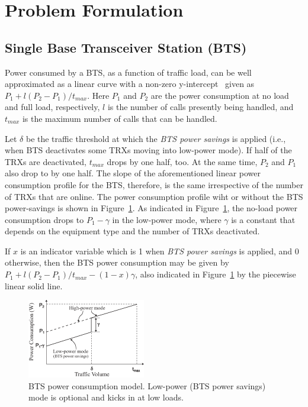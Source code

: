 \section{Problem Formulation}
\label{sec:formulation}
\subsection{Single Base Transceiver Station (BTS)}
Power consumed by a BTS, as a function of traffic load, can be
well approximated as a linear curve with a non-zero
y-intercept~\cite{Peng:2011:BTSSaving:Mobicom} given as
$P_1+l(P_2-P_1)/t_{max}$. Here $P_1$ and $P_2$ are the power
consumption at no load and full load, respectively, $l$ is the
number of calls presently being handled, and $t_{max}$ is the
maximum number of calls that can be handled.

Let $\delta$ be the traffic threshold at which the \textit{BTS
power savings} is applied (i.e., when BTS deactivates some TRXs
moving into low-power mode). If half of the TRXs are deactivated, $t_{max}$ drops by one half, too. At the same time, $P_2$ and $P_1$ also drop to by one half. The slope of the aforementioned linear power consumption profile for the BTS, therefore, is the same irrespective of the number of TRXs that are online. The power consumption profile wiht or without the BTS power-savings is shown in Figure~\ref{fig:powermodel1}. As
indicated in Figure~\ref{fig:powermodel1}, the no-load power
consumption drops to $P_1-\gamma$ in the low-power mode, where
$\gamma$ is a constant that depends on the equipment type and
the number of TRXs deactivated.

If $x$ is an indicator variable which is 1 when \textit{BTS
power savings} is applied, and $0$ otherwise, then the BTS
power consumption may be given by $P_1+l(P_2-P_1)/t_{max} -
(1-x)\gamma$, also indicated in Figure~\ref{fig:powermodel1} by
the piecewise linear solid line.

\begin{figure}
\centering
\includegraphics[width=0.46\textwidth]{figures/powermodel.eps}
\caption{BTS power consumption model. Low-power (BTS power savings) mode is optional and kicks in at low loads.}
\label{fig:powermodel1}
\end{figure}


